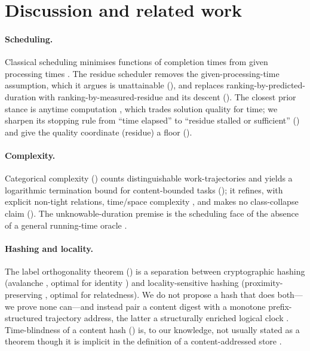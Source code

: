 \documentclass[twocolumn,10pt,a4paper]{article}
\theoremstyle{thmstyle}
\theoremstyle{definition}
\theoremstyle{remark}
\begin{document}
\section{Discussion and related work}
\label{sec:related}

\paragraph{Scheduling.} Classical scheduling minimises functions of
completion times from given processing times \citep{pinedo2016,
brucker2007,liu1973,coffman1968}. The residue scheduler removes the
given-processing-time assumption, which it argues is unattainable
(), and replaces ranking-by-predicted-duration with
ranking-by-measured-residue and its descent
(). The closest prior stance is anytime computation
\citep{dean1988,zilberstein1996}, which trades solution quality for time;
we sharpen its stopping rule from ``time elapsed'' to ``residue stalled or
sufficient'' () and give the
quality coordinate (residue) a floor ().

\paragraph{Complexity.} Categorical complexity
() counts distinguishable work-trajectories and
yields a logarithmic termination bound for content-bounded tasks
(); it refines, with explicit non-tight relations,
time/space complexity \citep{hartmanis1965,arora2009,sipser2013,blum1967},
and makes no class-collapse claim (). The
unknowable-duration premise is the scheduling face of the absence of a
general running-time oracle \citep{turing1936,blum1967}.

\paragraph{Hashing and locality.} The label orthogonality theorem
() is a separation between cryptographic hashing
(avalanche \citep{shannon1949,webster1986,feistel1973}, optimal for
identity \citep{nist180-4,katz2014,stevens2017}) and locality-sensitive
hashing (proximity-preserving \citep{indyk1998,broder1997,charikar2002},
optimal for relatedness). We do not propose a hash that does both---we
prove none can---and instead pair a content digest with a monotone
prefix-structured trajectory address, the latter a structurally enriched
logical clock \citep{lamport1978,fidge1988,mattern1989}. Time-blindness
of a content hash () is, to our knowledge, not
usually stated as a theorem though it is implicit in the definition of a
content-addressed store \citep{merkle1980,merkle1988}.
\end{document}
